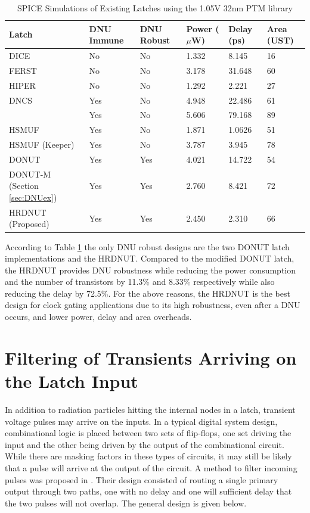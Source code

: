 \begin{table}[h]
	\begin{center}
		\caption{SPICE Simulations of Existing Latches using the 1.05V 32nm PTM library }
		\label{table:rtable}
		\begin{tabular}{|m{8em}|m{5em}|m{5em}|m{3em}|m{3em}|m{3em}|}
			\hline
			Latch & DNU Immune & DNU Robust & Power ($\mu$W) & Delay (ps) & Area (UST)\\ 
			\hline
			DICE & No & No & 1.332 & 8.145 & 16 \\
			\hline
			FERST & No & No & 3.178 & 31.648 & 60 \\
			\hline
			HIPER & No & No & 1.292 & 2.221 & 27 \\
			\hhline{|=|=|=|=|=|=|}
			DNCS & Yes & No & 4.948 & 22.486 & 61 \\
			\hline
			\cite{Inter} & Yes & No & 5.606 & 79.168 & 89 \\
			\hline
			HSMUF & Yes & No & 1.871 & 1.0626 & 51 \\
			\hline
			HSMUF (Keeper) & Yes & No & 3.787 & 3.945 & 78 \\
			\hhline{|=|=|=|=|=|=|}
			DONUT \cite{DONUT} & Yes & Yes & 4.021 & 14.722 & 54 \\ 
			\hline
			DONUT-M \newline (Section \ref{sec:DNUex}) & Yes & Yes & 2.760 & 8.421 & 72\\
			\hline
			HRDNUT \newline (Proposed) & Yes & Yes & 2.450 & 2.310 & 66 \\
			\hline
		\end{tabular}
	\end{center}
\end{table}

According to Table \ref{table:rtable} the only DNU robust designs are the two DONUT latch implementations and the HRDNUT. Compared to the modified DONUT latch, the HRDNUT provides DNU robustness while reducing the power consumption and the number of transistors by 11.3\% and 8.33\% respectively while also reducing the delay by 72.5\%. For the above reasons, the HRDNUT is the best design for clock gating applications due to its high robustness, even after a DNU occurs, and lower power, delay and area overheads.

\section{Filtering of Transients Arriving on the Latch Input}
In addition to radiation particles hitting the internal nodes in a latch, transient voltage pulses may arrive on the inputs. In a typical digital system design, combinational logic is placed between two sets of flip-flops, one set driving the input and the other being driven by the output of the combinational circuit. While there are masking factors in these types of circuits, it may still be likely that a pulse will arrive at the output of the circuit. A method to filter incoming pulses was proposed in \cite{FERST}. Their design consisted of routing a single primary output through two paths, one with no delay and one will sufficient delay that the two pulses will not overlap. The general design is given below.

